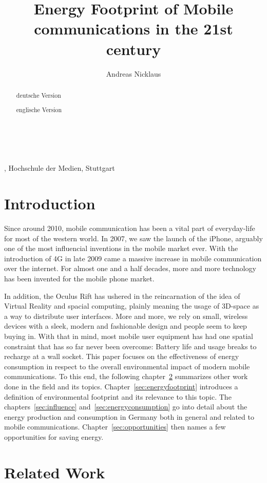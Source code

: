 \documentclass[11pt,a4paper]{article}
\title{Energy Footprint of Mobile communications in the 21st century}
\author{Andreas Nicklaus}
\makeatletter
\renewcommand\maketitle{
{\raggedright
\begin{center}
{\Large \bfseries \@title}\\[2ex] 
\@author\\[1ex] 
\@date, Hochschule der Medien, Stuttgart\\[1ex]
\end{center}}}
\makeatother
\begin{document}
\maketitle

\begin{abstract}
  deutsche Version
\end{abstract}


\begin{abstract}
  englische Version
\end{abstract}

\tableofcontents

\section{Introduction}\label{sec:intro}
Since around 2010, mobile communication has been a vital part of everyday-life for most of the western world.
In 2007, we saw the launch of the iPhone, arguably one of the most influencial inventions in the mobile market ever.
With the introduction of 4G in late 2009 came a massive increase in mobile communication over the internet.
For almost one and a half decades, more and more technology has been invented for the mobile phone market.

In addition, the Oculus Rift has ushered in the reincarnation of the idea of Virtual Reality and spacial computing, plainly meaning the usage of 3D-space as a way to distribute user interfaces.
More and more, we rely on small, wireless devices with a sleek, modern and fashionable design and people seem to keep buying in. 
With that in mind, most mobile user equipment has had one spatial constraint that has so far never been overcome: Battery life and usage breaks to recharge at a wall socket.
This paper focuses on the effectiveness of energy consumption in respect to the overall environmental impact of modern mobile communications.
To this end, the following chapter~\ref{sec:relatedwork} summarizes other work done in the field and its topics.
Chapter~\ref{sec:energyfootprint} introduces a definition of environmental footprint and its relevance to this topic.
The chapters~\ref{sec:influence} and~\ref{sec:energyconsumption} go into detail about the energy production and consumption in Germany both in general and related to mobile communications.
Chapter~\ref{sec:opportunities} then names a few opportunities for saving energy.

\section{Related Work}\label{sec:relatedwork}
\end{document}

